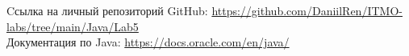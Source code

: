 \begin{thebibliography}{}
     Cсылка на личный репозиторий GitHub: \url{https://github.com/DaniilRen/ITMO-labs/tree/main/Java/Lab5}\\
     Документация по Java: \url{https://docs.oracle.com/en/java/}
\end{thebibliography}